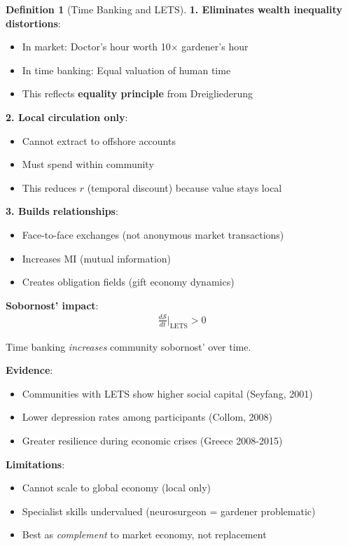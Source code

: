 \documentclass[11pt,a4paper]{article}
\theoremstyle{definition}
\newtheorem{definition}{Definition}[section]
\theoremstyle{remark}
\begin{document}
\begin{small}
\begin{enumerate}
\begin{definition}[Time Banking and LETS]
\textbf{1. Eliminates wealth inequality distortions}:
\begin{itemize}
    \item In market: Doctor's hour worth 10× gardener's hour
    \item In time banking: Equal valuation of human time
    \item This reflects \textbf{equality principle} from Dreigliederung
\end{itemize}

\textbf{2. Local circulation only}:
\begin{itemize}
    \item Cannot extract to offshore accounts
    \item Must spend within community
    \item This reduces \(r\) (temporal discount) because value stays local
\end{itemize}

\textbf{3. Builds relationships}:
\begin{itemize}
    \item Face-to-face exchanges (not anonymous market transactions)
    \item Increases \(\text{MI}\) (mutual information)
    \item Creates obligation fields (gift economy dynamics)
\end{itemize}

\textbf{Sobornost' impact}:
\begin{align}
\frac{d\mathcal{S}}{dt}\bigg|_{\text{LETS}} > 0
\end{align}

Time banking \textit{increases} community sobornost' over time.

\textbf{Evidence}:
\begin{itemize}
    \item Communities with LETS show higher social capital (Seyfang, 2001)
    \item Lower depression rates among participants (Collom, 2008)
    \item Greater resilience during economic crises (Greece 2008-2015)
\end{itemize}

\textbf{Limitations}:
\begin{itemize}
    \item Cannot scale to global economy (local only)
    \item Specialist skills undervalued (neurosurgeon = gardener problematic)
    \item Best as \textit{complement} to market economy, not replacement
\end{itemize}
\end{definition}


\end{enumerate}
\end{small}
\end{document}
